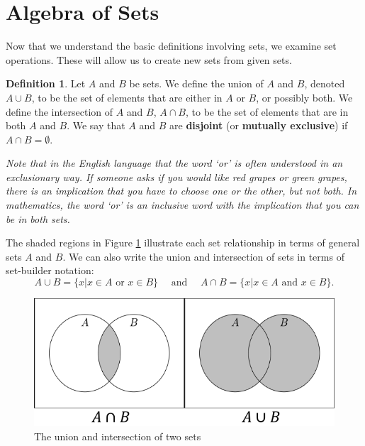 \documentclass[
]{book}
\theoremstyle{definition}
\newtheorem{definition}{Definition}[chapter]
\theoremstyle{definition}
\theoremstyle{definition}
\theoremstyle{definition}
\theoremstyle{remark}
\begin{document}
\hypertarget{algebra-of-sets}{%
\section{Algebra of Sets}\label{algebra-of-sets}}

Now that we understand the basic definitions involving sets, we examine set operations. These will allow us to create new sets from given sets.

\begin{definition}
Let \(A\) and \(B\) be sets. We define the union of \(A\) and \(B\), denoted \(A \cup B\), to be the set of elements that are either in \(A\) or \(B\), or possibly both. We define the intersection of \(A\) and \(B\), \(A \cap B\), to be the set of elements that are in both \(A\) and \(B\). We say that \(A\) and \(B\) are \textbf{disjoint} (or \textbf{mutually exclusive}) if \(A\cap B = \emptyset\).
\end{definition}

\emph{Note that in the English language that the word `or' is often understood in an exclusionary way. If someone asks if you would like red grapes or green grapes, there is an implication that you have to choose one or the other, but not both. In mathematics, the word `or' is an inclusive word with the implication that you can be in both sets.}

The shaded regions in Figure \ref{fig:set-union} illustrate each set relationship in terms of general sets \(A\) and \(B\). We can also write the union and intersection of sets in terms of set-builder notation:
\[A\cup B = \{x \vert x\in A \mbox{ or } x\in B\} \quad \mbox{ and } \quad A\cap B =\{x\vert x\in A \mbox{ and } x\in B\}.\]

\begin{figure}

{\centering \includegraphics[width=0.7\linewidth]{tikz/Set_unions_intersections} 

}

\caption{The union and intersection of two sets}\label{fig:set-union}
\end{figure}
\end{document}
